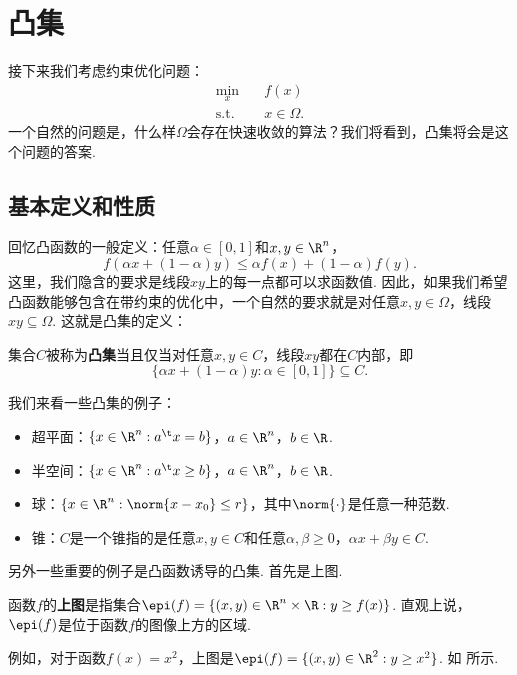 \section{凸集}
接下来我们考虑约束优化问题：
\begin{align*}
    \min_x &\quad f(x)\\
    \text{s.t.}&\quad x\in \Omega.
\end{align*}
一个自然的问题是，什么样$\Omega$会存在快速收敛的算法？我们将看到，凸集将会是这个问题的答案.

\subsection{基本定义和性质}
回忆凸函数的一般定义：任意$\alpha\in[0,1]$和$x,y\in\R^n$，
    \[
        f(\alpha x+(1-\alpha) y)\leq \alpha f(x)+(1-\alpha) f(y).
    \]
这里，我们隐含的要求是线段$xy$上的每一点都可以求函数值. 因此，如果我们希望凸函数能够包含在带约束的优化中，一个自然的要求就是对任意$x,y\in \Omega$，线段$xy\subseteq \Omega$. 这就是凸集的定义：

\begin{definition}[凸集]
集合$C$被称为\textbf{凸集}当且仅当对任意$x,y\in C$，线段$xy$都在$C$内部，即
\[\{\alpha x+(1-\alpha)y:\alpha\in [0,1]\}\subseteq C.\]
\end{definition}

我们来看一些凸集的例子：
\begin{example}
\begin{itemize}
    \item 超平面：$\{x\in\R^n:a^\t x= b\}$，$a\in\R^n$，$b\in\R$. 
    \item 半空间：$\{x\in\R^n:a^\t x\geq b\}$，$a\in\R^n$，$b\in\R$. 
    \item 球：$\{x\in\R^n:\norm{x-x_0}\leq r\}$，其中$\norm{\cdot}$是任意一种范数. 
    \item 锥：$C$是一个锥指的是任意$x,y\in C$和任意$\alpha,\beta\geq 0$，$\alpha x+\beta y\in C$. 
\end{itemize}
\end{example}

另外一些重要的例子是凸函数诱导的凸集. 首先是上图. 

\begin{definition}[上图]
    函数$f$的\textbf{上图}是指集合$\epi(f)=\{(x,y)\in\R^{n}\times\R:y\geq f(x)\}$. 直观上说，$\epi(f)$是位于函数$f$的图像上方的区域.
\end{definition}

例如，对于函数$f(x)=x^2$，上图是$\epi(f)=\{(x,y)\in\R^2:y\geq x^2\}$. 如 所示.

